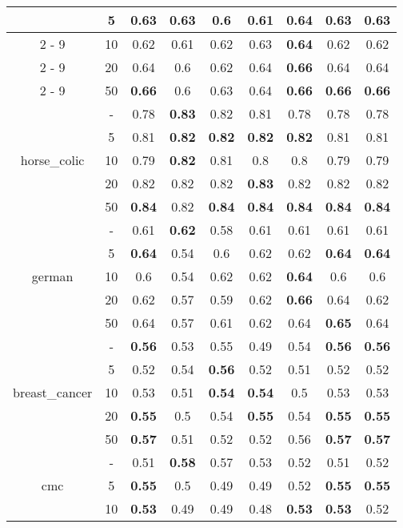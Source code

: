 \documentclass{article}%
\begin{document}
\begin{tabular}{c|c|ccccccc}
&5&0.63&0.63&0.6&0.61&\textbf{0.64}&0.63&0.63\\%
\cline{2%
-%
9}%
&10&0.62&0.61&0.62&0.63&\textbf{0.64}&0.62&0.62\\%
\cline{2%
-%
9}%
&20&0.64&0.6&0.62&0.64&\textbf{0.66}&0.64&0.64\\%
\cline{2%
-%
9}%
&50&\textbf{0.66}&0.6&0.63&0.64&\textbf{0.66}&\textbf{0.66}&\textbf{0.66}\\%
\hline%
\multirow{5}{*}{horse\_colic}&{-}&0.78&\textbf{0.83}&0.82&0.81&0.78&0.78&0.78\\%
\cline{2%
-%
9}%
&5&0.81&\textbf{0.82}&\textbf{0.82}&\textbf{0.82}&\textbf{0.82}&0.81&0.81\\%
\cline{2%
-%
9}%
&10&0.79&\textbf{0.82}&0.81&0.8&0.8&0.79&0.79\\%
\cline{2%
-%
9}%
&20&0.82&0.82&0.82&\textbf{0.83}&0.82&0.82&0.82\\%
\cline{2%
-%
9}%
&50&\textbf{0.84}&0.82&\textbf{0.84}&\textbf{0.84}&\textbf{0.84}&\textbf{0.84}&\textbf{0.84}\\%
\hline%
\multirow{5}{*}{german}&{-}&0.61&\textbf{0.62}&0.58&0.61&0.61&0.61&0.61\\%
\cline{2%
-%
9}%
&5&\textbf{0.64}&0.54&0.6&0.62&0.62&\textbf{0.64}&\textbf{0.64}\\%
\cline{2%
-%
9}%
&10&0.6&0.54&0.62&0.62&\textbf{0.64}&0.6&0.6\\%
\cline{2%
-%
9}%
&20&0.62&0.57&0.59&0.62&\textbf{0.66}&0.64&0.62\\%
\cline{2%
-%
9}%
&50&0.64&0.57&0.61&0.62&0.64&\textbf{0.65}&0.64\\%
\hline%
\multirow{5}{*}{breast\_cancer}&{-}&\textbf{0.56}&0.53&0.55&0.49&0.54&\textbf{0.56}&\textbf{0.56}\\%
\cline{2%
-%
9}%
&5&0.52&0.54&\textbf{0.56}&0.52&0.51&0.52&0.52\\%
\cline{2%
-%
9}%
&10&0.53&0.51&\textbf{0.54}&\textbf{0.54}&0.5&0.53&0.53\\%
\cline{2%
-%
9}%
&20&\textbf{0.55}&0.5&0.54&\textbf{0.55}&0.54&\textbf{0.55}&\textbf{0.55}\\%
\cline{2%
-%
9}%
&50&\textbf{0.57}&0.51&0.52&0.52&0.56&\textbf{0.57}&\textbf{0.57}\\%
\hline%
\multirow{5}{*}{cmc}&{-}&0.51&\textbf{0.58}&0.57&0.53&0.52&0.51&0.52\\%
\cline{2%
-%
9}%
&5&\textbf{0.55}&0.5&0.49&0.49&0.52&\textbf{0.55}&\textbf{0.55}\\%
\cline{2%
-%
9}%
&10&\textbf{0.53}&0.49&0.49&0.48&\textbf{0.53}&\textbf{0.53}&0.52\\%

\end{tabular}
\end{document}
